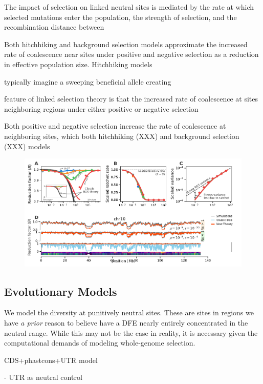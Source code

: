 \documentclass[11pt]{article}
\begin{document}
The impact of selection on linked neutral sites is mediated by the rate at
which selected mutations enter the population, the strength of selection, and
the recombination distance between 


Both
hitchhiking and background selection models approximate the increased rate of
coalescence near sites under positive and negative selection as a reduction in
effective population size. Hitchhiking models 

typically imagine a sweeping
beneficial allele creating 


feature of linked selection theory is that the increased rate of coalescence at
sites neighboring regions under either positive or negative selection


Both positive
and negative selection increase the rate of coalescence at neighboring sites,
which both hitchhiking (XXX) and background selection (XXX) models 



\begin{figure}[!htb]
  \centering
  \includegraphics{figures/figure1.pdf}
  \caption{}
  \label{fig:figure-1}
\end{figure}


\subsection*{Evolutionary Models}

We model the diversity at punitively neutral sites. These are sites in regions
we have \emph{a prior} reason to believe have a DFE nearly entirely
concentrated in the neutral range. While this may not be the case in reality,
it is necessary given the computational demands of modeling whole-genome
selection. 

CDS+phastcons+UTR model

 - UTR as neutral control
\end{document}
